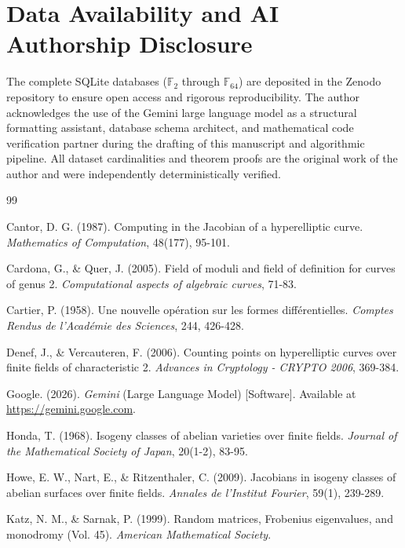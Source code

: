 \documentclass[letterpaper, 11pt]{article}
\begin{document}
\section{Data Availability and AI Authorship Disclosure}
The complete SQLite databases ($\mathbb{F}_{2}$ through $\mathbb{F}_{64}$) are deposited in the Zenodo repository to ensure open access and rigorous reproducibility. The author acknowledges the use of the Gemini large language model \cite{Gemini2026} as a structural formatting assistant, database schema architect, and mathematical code verification partner during the drafting of this manuscript and algorithmic pipeline. All dataset cardinalities and theorem proofs are the original work of the author and were independently deterministically verified.

\begin{thebibliography}{99}

Cantor, D. G. (1987). Computing in the Jacobian of a hyperelliptic curve. \textit{Mathematics of Computation}, 48(177), 95-101.

Cardona, G., \& Quer, J. (2005). Field of moduli and field of definition for curves of genus 2. \textit{Computational aspects of algebraic curves}, 71-83.

Cartier, P. (1958). Une nouvelle op\'{e}ration sur les formes diff\'{e}rentielles. \textit{Comptes Rendus de l'Acad\'{e}mie des Sciences}, 244, 426-428.

Denef, J., \& Vercauteren, F. (2006). Counting points on hyperelliptic curves over finite fields of characteristic 2. \textit{Advances in Cryptology - CRYPTO 2006}, 369-384.

Google. (2026). \textit{Gemini} (Large Language Model) [Software]. Available at \url{https://gemini.google.com}.

Honda, T. (1968). Isogeny classes of abelian varieties over finite fields. \textit{Journal of the Mathematical Society of Japan}, 20(1-2), 83-95.

Howe, E. W., Nart, E., \& Ritzenthaler, C. (2009). Jacobians in isogeny classes of abelian surfaces over finite fields. \textit{Annales de l'Institut Fourier}, 59(1), 239-289.

Katz, N. M., \& Sarnak, P. (1999). Random matrices, Frobenius eigenvalues, and monodromy (Vol. 45). \textit{American Mathematical Society}.


\end{thebibliography}
\end{document}
